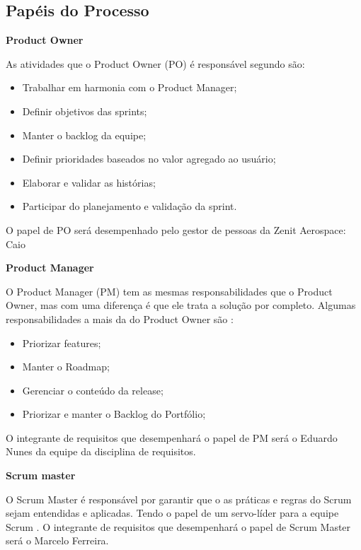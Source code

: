 \subsection[processopapeis]{Papéis do Processo}
\begin{description}
\item \textbf{Product Owner}

As atividades que o Product Owner (PO) é responsável segundo \cite{leffingwell2011} são:
\begin{itemize}
    \item Trabalhar em harmonia com o Product Manager;
    \item Definir objetivos das sprints;
    \item Manter o backlog da equipe;
    \item Definir prioridades baseados no valor agregado ao usuário;
    \item Elaborar e validar as histórias;
    \item Participar do planejamento e validação da sprint.
\end{itemize}
O papel de PO será desempenhado pelo gestor de pessoas da Zenit Aerospace: Caio

\item \textbf{Product Manager}

O Product Manager (PM) tem as mesmas responsabilidades que o Product Owner, mas com uma diferença é que ele trata a solução por completo. Algumas responsabilidades a mais da do Product Owner são \cite{leffingwell2011}:
\begin{itemize}
    \item Priorizar features;
    \item Manter o Roadmap;
    \item Gerenciar o conteúdo da release;
    \item Priorizar e manter o Backlog do Portfólio;
\end{itemize}

O integrante de requisitos que desempenhará o papel de PM será o Eduardo Nunes da equipe da disciplina de requisitos.

\item \textbf{Scrum master}

O Scrum Master é responsável por garantir que o as práticas e regras do Scrum sejam entendidas e aplicadas. Tendo o papel de um servo-líder para a equipe Scrum \cite{agileManifest}. O integrante de requisitos que desempenhará o papel de Scrum Master será o Marcelo Ferreira.


\end{description}
